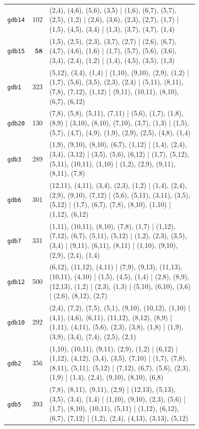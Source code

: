 \begin{landscape}
\begin{longtable}{lr>{\tiny\raggedright\arraybackslash}p{0.78\linewidth}}
\texttt{gdb14} & 102 & (2,4), (4,6), (5,6), (3,5) | (1,6), (6,7), (5,7), (2,5), (1,2) | (2,6), (3,6), (2,3), (2,7), (1,7) | (1,5), (4,5), (3,4) | (1,3), (3,7), (4,7), (1,4) \\[2pt]
\texttt{gdb15} & $\mathbf{58}$ & (1,5), (2,5), (2,3), (3,7), (2,7) | (2,6), (6,7), (4,7), (4,6), (1,6) | (1,7), (5,7), (5,6), (3,6), (3,4), (2,4), (1,2) | (1,4), (4,5), (3,5), (1,3) \\[2pt]
\texttt{gdb1} & 323 & (5,12), (3,4), (1,4) | (1,10), (9,10), (2,9), (1,2) | (1,7), (5,6), (3,5), (2,3), (2,4) | (5,11), (8,11), (7,8), (7,12), (1,12) | (9,11), (10,11), (8,10), (6,7), (6,12) \\[2pt]
\texttt{gdb20} & 130 & (7,8), (5,8), (5,11), (7,11) | (5,6), (1,7), (1,8), (8,9) | (3,10), (8,10), (7,10), (3,7), (1,3) | (1,5), (5,7), (4,7), (4,9), (1,9), (2,9), (2,5), (4,8), (1,4) \\[2pt]
\texttt{gdb3} & 289 & (1,9), (9,10), (8,10), (6,7), (1,12) | (1,4), (2,4), (3,4), (3,12) | (3,5), (5,6), (6,12) | (1,7), (5,12), (5,11), (10,11), (1,10) | (1,2), (2,9), (9,11), (8,11), (7,8) \\[2pt]
\texttt{gdb6} & 301 & (12,11), (4,11), (3,4), (2,3), (1,2) | (1,4), (2,4), (2,9), (9,10), (7,12) | (5,6), (5,11), (3,11), (3,5), (5,12) | (1,7), (6,7), (7,8), (8,10), (1,10) | (1,12), (6,12) \\[2pt]
\texttt{gdb7} & 331 & (1,11), (10,11), (8,10), (7,8), (1,7) | (1,12), (7,12), (6,7), (5,11), (5,12) | (1,2), (2,3), (3,5), (3,4) | (9,11), (6,11), (8,11) | (1,10), (9,10), (2,9), (2,4), (1,4) \\[2pt]
\texttt{gdb12} & 500 & (6,12), (11,12), (4,11) | (7,9), (9,13), (11,13), (10,11), (4,10) | (1,5), (4,5), (1,4) | (2,8), (8,9), (12,13), (1,2) | (2,3), (1,3) | (5,10), (6,10), (3,6) | (2,6), (8,12), (2,7) \\[2pt]
\texttt{gdb10} & 292 & (2,4), (7,2), (7,5), (5,1), (9,10), (10,12), (1,10) | (4,1), (4,6), (6,11), (11,12), (8,12), (8,9) | (1,11), (4,11), (5,6), (2,3), (3,8), (1,8) | (1,9), (3,9), (3,4), (7,4), (2,5), (2,1) \\[2pt]
\texttt{gdb2} & 356 & (1,10), (10,11), (9,11), (2,9), (1,2) | (6,12) | (1,12), (4,12), (3,4), (3,5), (7,10) | (1,7), (7,8), (8,11), (5,11), (5,12) | (7,12), (6,7), (5,6), (2,3), (1,9) | (1,4), (2,4), (9,10), (8,10), (6,8) \\[2pt]
\texttt{gdb5} & 393 & (7,8), (8,11), (9,11), (2,9) | (12,13), (5,13), (3,5), (3,4), (1,4) | (1,10), (9,10), (2,3), (5,6) | (1,7), (8,10), (10,11), (5,11) | (1,12), (6,12), (6,7), (7,12) | (1,2), (2,4), (4,13), (3,13), (5,12) \\[2pt]

\end{longtable}
\end{landscape}
